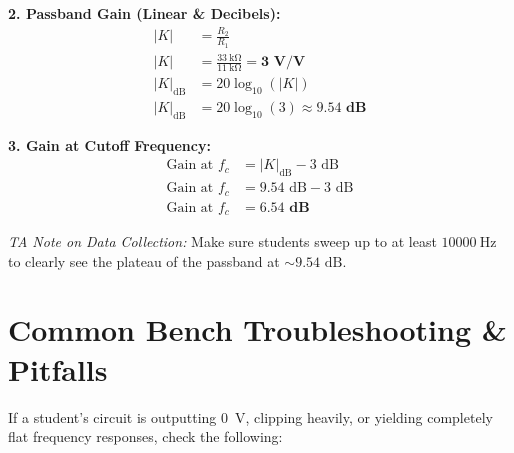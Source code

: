 \documentclass[11pt]{article}
\begin{document}
\textbf{2. Passband Gain (Linear \& Decibels):}
\begin{align*}
  |K| &= \frac{R_2}{R_1} \\
  |K| &= \frac{\SI{33}{\kilo\ohm}}{\SI{11}{\kilo\ohm}} = \mathbf{3 \text{ V/V}} \\[1ex]
  |K|_{\text{dB}} &= 20 \log_{10}(|K|) \\
  |K|_{\text{dB}} &= 20 \log_{10}(3) \approx \mathbf{9.54 \text{ dB}}
\end{align*}

\textbf{3. Gain at Cutoff Frequency:}
\begin{align*}
  \text{Gain at } f_c &= |K|_{\text{dB}} - 3\text{ dB} \\
  \text{Gain at } f_c &= 9.54\text{ dB} - 3\text{ dB} \\
  \text{Gain at } f_c &= \mathbf{6.54 \text{ dB}}
\end{align*}

\textit{TA Note on Data Collection:} Make sure students sweep up to at least $\SI{10000}{\hertz}$ to clearly see the plateau of the passband at $\sim 9.54 \text{ dB}$.

\newpage
\section*{Common Bench Troubleshooting \& Pitfalls}

If a student's circuit is outputting \SI{0}{\volt}, clipping heavily, or yielding completely flat frequency responses, check the following:
\end{document}
